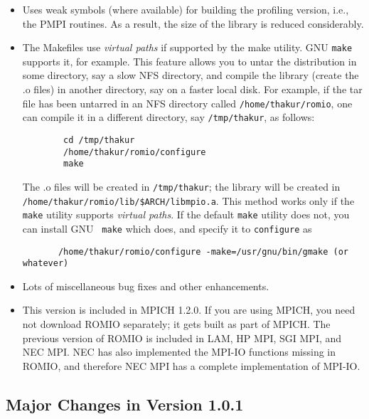 \begin{itemize}
\item Uses weak symbols (where available) for building the profiling version,
  i.e., the PMPI routines. As a result, the size of the library is reduced
  considerably. 

\item The Makefiles use {\em virtual paths} if supported by the make
  utility. GNU {\tt make}
  supports it, for example. This feature allows you to untar the
  distribution in some directory, say a slow NFS directory,
  and compile the library (create the .o files) in another 
  directory, say on a faster local disk. For example, if the tar file
  has been untarred in an NFS directory called {\tt /home/thakur/romio},
  one can compile it in a different directory, say {\tt /tmp/thakur}, as
  follows:
\begin{verbatim}
        cd /tmp/thakur
        /home/thakur/romio/configure
        make
\end{verbatim}
  The .o files will be created in {\tt /tmp/thakur}; the library will be created in\newline
  {\tt /home/thakur/romio/lib/\$ARCH/libmpio.a}.
  This method works only if the {\tt make} utility supports {\em
  virtual paths}. 
  If the default {\tt make} utility does not, you can install GNU {\tt
  make} which does, and specify it to {\tt configure} as
\begin{verbatim}
       /home/thakur/romio/configure -make=/usr/gnu/bin/gmake (or whatever)
\end{verbatim}

\item Lots of miscellaneous bug fixes and other enhancements.

\item This version is included in MPICH 1.2.0. If you are using MPICH, you
  need not download ROMIO separately; it gets built as part of MPICH.
  The previous version of ROMIO is included in LAM, HP MPI, SGI MPI, and 
  NEC MPI. NEC has also implemented the MPI-IO functions missing 
  in ROMIO, and therefore NEC MPI has a complete implementation of MPI-IO.
\end{itemize}


\subsection{Major Changes in Version 1.0.1}

